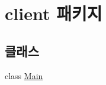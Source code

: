 \hypertarget{namespaceclient}{\section{client 패키지}
\label{namespaceclient}
}
\subsection*{클래스}
\begin{DoxyCompactItemize}
\item 
class \hyperlink{classclient_1_1_main}{Main}
\end{DoxyCompactItemize}
